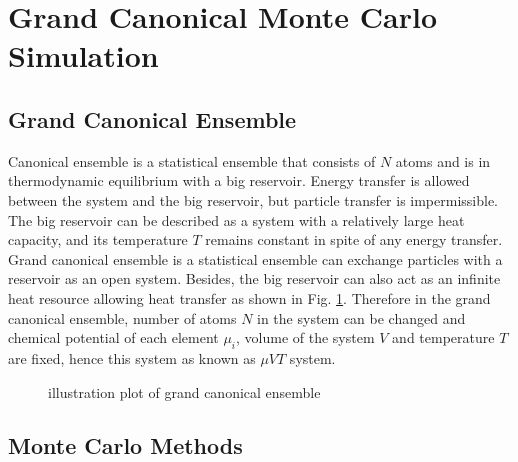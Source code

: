 \section{Grand Canonical Monte Carlo Simulation}
\label{Chap:Mech:GCMC}

\subsection{Grand Canonical Ensemble}

Canonical ensemble is a statistical ensemble that consists of $N$ atoms and is in thermodynamic equilibrium with a big reservoir. Energy transfer is allowed between the system and the big reservoir, but particle transfer is impermissible. The big reservoir can be described as a system with a relatively large heat capacity, and its temperature $T$ remains constant in spite of any energy transfer. Grand canonical ensemble is a statistical ensemble can exchange particles with a reservoir as an open system. Besides, the big reservoir can also act as an infinite heat resource allowing heat transfer as shown in Fig. \ref{Chap:Meth:GCMC:fig1}. \cite{frenkel2001understanding} Therefore in the grand canonical ensemble, number of atoms $N$ in the system can be changed and chemical potential of each element $\mu_i$, volume of the system $V$ and temperature $T$ are fixed, hence this system as known as $\mu VT$ system.

\begingroup
\begin{figure}[!ht]
  \centering
  \caption[Illustration plot of grand canonical ensemble]{illustration plot of grand canonical ensemble\cite{kokcasting}}
  \label{Chap:Meth:GCMC:fig1}
\end{figure}
\endgroup

\subsection{Monte Carlo Methods}
\label{Chap:Mech:GCMC:MC}

